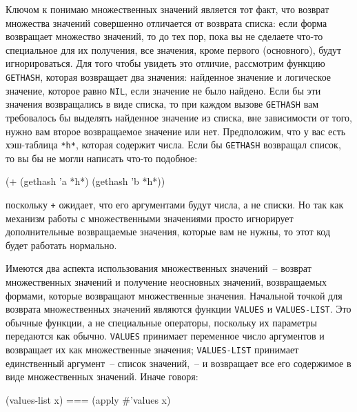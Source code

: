 Ключом к понимаю множественных значений является тот факт, что возврат множества значений
совершенно отличается от возврата списка: если форма возвращает множество значений, то
до тех пор, пока вы не сделаете что-то специальное для их получения, все значения, кроме
первого (основного), будут игнорироваться.  Для того чтобы увидеть это отличие, рассмотрим
функцию \lstinline{GETHASH}, которая возвращает два значения: найденное значение и логическое
значение, которое равно \lstinline{NIL}, если значение не было найдено.  Если бы эти значения
возвращались в виде списка, то при каждом вызове \lstinline{GETHASH} вам требовалось бы
выделять найденное значение из списка, вне зависимости от того, нужно вам второе
возвращаемое значение или нет.  Предположим, что у вас есть хэш-таблица \lstinline{*h*},
которая содержит числа.  Если бы \lstinline{GETHASH} возвращал список, то вы бы не могли
написать что-то подобное:

\begin{myverb}
(+ (gethash 'a *h*) (gethash 'b *h*))
\end{myverb}

\noindent{}поскольку \lstinline{+} ожидает, что его аргументами будут числа, а не
списки. Но так как механизм работы с множественными значениями просто игнорирует
дополнительные возвращаемые значения, которые вам не нужны, то этот код будет работать
нормально.

Имеются два аспекта использования множественных значений~-- возврат множественных
значений и получение неосновных значений, возвращаемых формами, которые возвращают
множественные значения.  Начальной точкой для возврата множественных значений являются
функции \lstinline{VALUES} и \lstinline{VALUES-LIST}.  Это обычные функции, а не специальные
операторы, поскольку их параметры передаются как обычно.  \lstinline{VALUES} принимает переменное
число аргументов и возвращает их как множественные значения; \lstinline{VALUES-LIST} принимает
единственный аргумент~-- список значений,~-- и возвращает все его содержимое в виде
множественных значений.  Иначе говоря:

\begin{myverb}
  (values-list x) === (apply #'values x)
\end{myverb}

